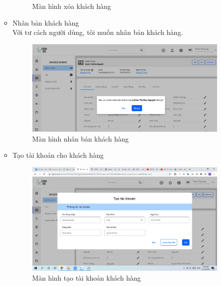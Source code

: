 \documentclass[12pt,a4paper]{article}
\begin{document}
\begin{enumerate}
\begin{itemize}
\begin{figure}[H]
                \vspace{0.5cm}
                \caption{Màn hình xóa khách hàng}
                \label{xoaKH}
            \end{figure}
            \item Nhân bản khách hàng \\
            Với tư cách người dùng, tôi muốn nhân bản khách hàng.
            \begin{figure}[H]
                \centering \includegraphics[width=\textwidth]{Img/Nguyet/Khachhang/nhanbankhachhang.png}
                \vspace{0.5cm}
                \caption{Màn hình nhân bản khách hàng}
                \label{nhanbanKH}
            \end{figure}
            \item Tạo tài khoản cho khách hàng \\

            \begin{figure}[H]
                \centering \includegraphics[width=\textwidth]{Img/Nguyet/Khachhang/taoTKKH.png}
                \vspace{0.5cm}
                \caption{Màn hình tạo tài khoản khách hàng}
                \label{taoTKKH}
            \end{figure}


\end{itemize}
\end{enumerate}
\end{document}
